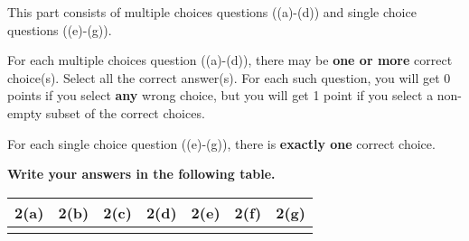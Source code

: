 
This part consists of multiple choices questions ((a)-(d)) and single choice questions ((e)-(g)).

For each multiple choices question ((a)-(d)), there may be \textbf{one or more} correct choice(s). Select all the correct answer(s). For each such question, you will get 0 points if you select \textbf{any} wrong choice, but you will get 1 point if you select a non-empty subset of the correct choices.

For each single choice question ((e)-(g)), there is \textbf{exactly one} correct choice. 

\textbf{Write your answers in the following table.}


\begin{table}[htbp]
    \centering
    \begin{tabular}{|p{2cm}|p{2cm}|p{2cm}|p{2cm}|p{1cm}|p{1cm}|p{1cm}|}
        \hline
        2(a) & 2(b) & 2(c) & 2(d) & 2(e) & 2(f) & 2(g) \\
        \hline
         &  &  &  &  &  & \\
        \hline
    \end{tabular}
\end{table}

